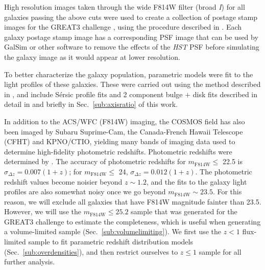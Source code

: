 \documentclass[twocolumn,useAMS,usenatbib]{mn2e}
\newcommand{\rachel}[1]{{\textcolor{red}{#1}}}
\newcommand{\sersic}{S\'{e}rsic }
\begin{document}
High resolution images taken through the wide F814W filter (broad
\emph{I}) for all galaxies passing the above cuts were used to create
a collection of postage stamp images for the GREAT3 challenge
\citep{great3}, using the procedure described in
\cite{2012MNRAS.420.1518M}.  Each galaxy postage stamp image has a
corresponding PSF image that can be used by {\sc GalSim} or other
software to remove the effects of the {\em HST} PSF before simulating
the galaxy image as it would appear at lower resolution.

To better characterize the galaxy population, parametric models were
fit to the light profiles of these galaxies.  These were carried out
using the method described in \cite{Claire_Fits}, and include
\sersic profile fits and 
2 component bulge $+$ disk fits described in detail in \cite{great3}
and briefly in Sec.~\ref{sub:axisratio} of this work.  

In addition to the ACS/WFC (F814W) imaging, the COSMOS field has also been imaged by Subaru Suprime-Cam, the
Canada-French Hawaii Telescope (CFHT) and KPNO/CTIO, yielding many bands
of imaging data used to determine high-fidelity photometric
redshifts. 
Photometric redshifts were determined by
\cite{COSMOS_Photoz_30band}. The accuracy of photometric redshifts for
$m_\text{F814W}\le$ 22.5 is $\sigma_{\Delta z} = 0.007(1+z)$; for $m_\text{F814W}\le$ 24, $\sigma_{\Delta z} = 0.012(1+z)$.
The photometric redshift values become noisier beyond $z\sim 1.2$, and
the  fits to the galaxy light profiles are also somewhat noisy once we
go beyond $m_\text{F814W}\sim 23.5$.   
For this reason, we will exclude all galaxies that have F814W
magnitude fainter than 23.5. However, we will use the
$m_\text{F814W}\le 25.2$ sample that was generated for the GREAT3
challenge to estimate the completeness, which is useful when
generating a volume-limited sample (Sec.~\ref{sub:volumelimiting}).
We first use the $z<1$ flux-limited sample to fit parametric redshift
distribution models (Sec.~\ref{sub:overdensities}), and then
restrict ourselves to $z\le1$ sample for all further analysis. 
\end{document}
